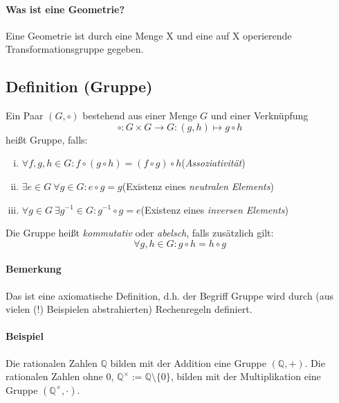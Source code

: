 \paragraph{Was ist eine Geometrie?}
	Eine Geometrie ist durch eine Menge X und eine auf X operierende Transformationsgruppe gegeben.

\subsection{Definition (Gruppe)}
	\begin{Definition}[Gruppe]
		Ein Paar $(G,\circ)$ bestehend aus einer Menge $G$ und einer Verknüpfung 
		\[\circ : G\times G \to G : (g,h) \mapsto g \circ h\]
		heißt Gruppe, falls:
                \begin{enumerate}[(i)]
                        \item $\forall f,g,h \in G : f\circ (g\circ h) = (f\circ g)\circ h$\hfill (\emph{Assoziativität})
                        \item $\exists e\in G\ \forall g\in G : e\circ g = g$\hfill (Existenz eines \emph{neutralen Elements})
                        \item $\forall g \in G\ \exists g^{-1} \in G : g^{-1}\circ g = e$\hfill (Existenz eines \emph{inversen Elements})
                \end{enumerate}
                Die Gruppe heißt \emph{kommutativ} oder \emph{abelsch}, falls zusätzlich gilt:
                        \[\forall g,h\in G: g\circ h = h\circ g\] %
	\end{Definition}

\paragraph{Bemerkung}
	Das ist eine axiomatische Definition, d.h. der Begriff \glqq Gruppe\grqq{} wird durch (aus vielen (!) Beispielen abstrahierten) \glqq Rechenregeln\grqq{} definiert.
\paragraph{Beispiel}
	Die rationalen Zahlen $\mathbb{Q}$ bilden mit der Addition eine Gruppe $(\mathbb{Q} ,+)$.
	Die rationalen Zahlen ohne $0$, $\mathbb{Q}^{\times} := \mathbb{Q}\setminus \{0\}$, bilden mit der Multiplikation eine Gruppe $(\mathbb{Q}^\times ,\cdot)$.

